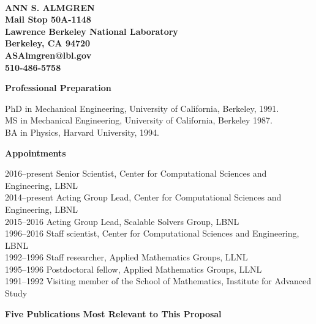 \documentclass[11pt,letterpaper,english]{article}
\begin{document}
\setlength{\parindent}{0in} %




\\
{\bf ANN S. ALMGREN}\\
{\bf Mail Stop 50A-1148 \\
Lawrence Berkeley National Laboratory \\
Berkeley, CA 94720 \\
ASAlmgren@lbl.gov \\
510-486-5758} \smallskip

\begin{flushleft} {\bf Professional Preparation}
{\parindent 12pt

PhD in Mechanical Engineering, University of California, Berkeley, 1991. \\
MS in Mechanical Engineering, University of California, Berkeley 1987.\\ 
BA in Physics, Harvard University, 1994.\\ 

}

\vspace{.04in}
{\bf Appointments}
{\parindent 12pt

2016--present Senior Scientist, Center for Computational Sciences and Engineering, LBNL \\ 
2014--present Acting Group Lead, Center for Computational Sciences and Engineering, LBNL \\ 
2015--2016    Acting Group Lead, Scalable Solvers Group, LBNL \\ 
1996--2016    Staff scientist, Center for Computational Sciences and Engineering, LBNL \\   
1992--1996    Staff researcher, Applied Mathematics Groups, LLNL \\ 
1995--1996    Postdoctoral fellow, Applied Mathematics Groups, LLNL \\ 
1991--1992    Visiting member of the School of Mathematics, Institute for Advanced Study \\

}

\vspace{.04in}
{\bf Five Publications Most Relevant to This Proposal}
\vspace{-6pt}
\begin{enumerate} \itemsep1pt \parskip0pt 


\end{enumerate}
\end{flushleft}
\end{document}
